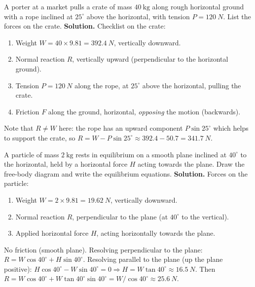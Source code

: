 \documentclass[11pt]{article}
\begin{document}
\begin{exoresolu}
A porter at a market pulls a crate of mass $40\ \mathrm{kg}$ along rough horizontal ground with a rope inclined at $25^{\circ}$ above the horizontal, with tension $P = \SI{120}{N}$. List the forces on the crate.
\tcblower
\textbf{Solution.} Checklist on the crate:
\begin{enumerate}
\item Weight $W = 40 \times 9.81 = \SI{392.4}{N}$, vertically downward.
\item Normal reaction $R$, vertically upward (perpendicular to the horizontal ground).
\item Tension $P = \SI{120}{N}$ along the rope, at $25^{\circ}$ above the horizontal, pulling the crate.
\item Friction $F$ along the ground, horizontal, \emph{opposing} the motion (backwards).
\end{enumerate}
Note that $R \neq W$ here: the rope has an upward component $P\sin 25^{\circ}$ which helps to support the crate, so $R = W - P\sin 25^{\circ} \approx 392.4 - 50.7 = \SI{341.7}{N}$.
\end{exoresolu}

\begin{exoresolu}
A particle of mass $2\ \mathrm{kg}$ rests in equilibrium on a smooth plane inclined at $40^{\circ}$ to the horizontal, held by a horizontal force $H$ acting towards the plane. Draw the free-body diagram and write the equilibrium equations.
\tcblower
\textbf{Solution.} Forces on the particle:
\begin{enumerate}
\item Weight $W = 2 \times 9.81 = \SI{19.62}{N}$, vertically downward.
\item Normal reaction $R$, perpendicular to the plane (at $40^{\circ}$ to the vertical).
\item Applied horizontal force $H$, acting horizontally towards the plane.
\end{enumerate}
No friction (smooth plane). Resolving perpendicular to the plane: $R = W\cos 40^{\circ} + H\sin 40^{\circ}$.
Resolving parallel to the plane (up the plane positive): $H\cos 40^{\circ} - W\sin 40^{\circ} = 0 \Rightarrow H = W\tan 40^{\circ} \approx \SI{16.5}{N}$.
Then $R = W\cos 40^{\circ} + W\tan 40^{\circ}\sin 40^{\circ} = W/\cos 40^{\circ} \approx \SI{25.6}{N}$.
\end{exoresolu}
\end{document}
